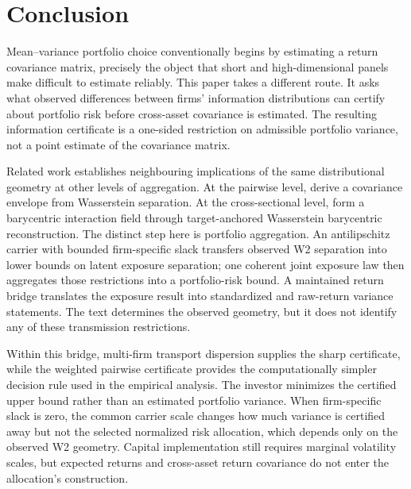 \section{Conclusion}\label{sec:conclusion}

Mean--variance portfolio choice conventionally begins by estimating a return
covariance matrix, precisely the object that short and high-dimensional panels
make difficult to estimate reliably.
This paper takes a different route.
It asks what observed differences between firms' information distributions can
certify about portfolio risk before cross-asset covariance is estimated.
The resulting information certificate is a one-sided restriction on admissible
portfolio variance, not a point estimate of the covariance matrix.

Related work establishes neighbouring implications of the same distributional
geometry at other levels of aggregation.
At the pairwise level, \citet{gawronsky_continuous_2026} derive a covariance
envelope from Wasserstein separation.
At the cross-sectional level, \citet{gawronsky_spatial_2027} form a barycentric
interaction field through target-anchored Wasserstein barycentric
reconstruction.
The distinct step here is portfolio aggregation.
An antilipschitz carrier with bounded firm-specific slack transfers observed W2
separation into lower bounds on latent exposure separation; one coherent joint
exposure law then aggregates those restrictions into a portfolio-risk bound.
A maintained return bridge translates the exposure result into standardized and
raw-return variance statements.
The text determines the observed geometry, but it does not identify any of these
transmission restrictions.

Within this bridge, multi-firm transport dispersion supplies the sharp
certificate, while the weighted pairwise certificate provides the
computationally simpler decision rule used in the empirical analysis.
The investor minimizes the certified upper bound rather than an estimated
portfolio variance.
When firm-specific slack is zero, the common carrier scale changes how much
variance is certified away but not the selected normalized risk allocation,
which depends only on the observed W2 geometry.
Capital implementation still requires marginal volatility scales, but expected
returns and cross-asset return covariance do not enter the allocation's
construction.

